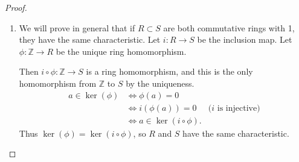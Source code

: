 \documentclass[12pt, psamsfonts]{amsart}
\theoremstyle{definition}
\theoremstyle{remark}
\numberwithin{equation}{section}
\begin{document}
\begin{proof}
  $ $
  \begin{enumerate}[label=(\roman*)]
    \item
      We will prove in general that if $R \subset S$ are both commutative rings with 1, they have the same characteristic.
      Let $i: R \rightarrow S$ be the inclusion map.
      Let $\phi: \mathbb{Z} \rightarrow R$ be the unique ring homomorphism.

      Then $i \circ \phi: \mathbb{Z} \rightarrow S$ is a ring homomorphism, and this is the only homomorphism from $\mathbb{Z}$ to $S$ by the uniqueness.
      \begin{align*}
        a \in \ker(\phi)
          &\iff \phi(a) = 0 \\
          &\iff i(\phi(a)) = 0 & \text{($i$ is injective)} \\
          &\iff a \in \ker(i \circ \phi).
      \end{align*}
      Thus $\ker(\phi) = \ker(i \circ \phi)$, so $R$ and $S$ have the same characteristic.


\end{enumerate}
\end{proof}
\end{document}
